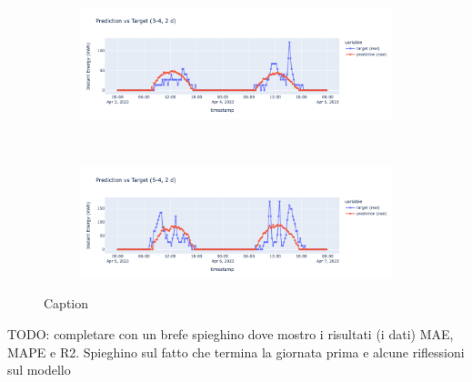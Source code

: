 \begin{figure}[H]
	\centering
	\begin{subfigure}{\textwidth}
		\centering
		\includegraphics[width=\textwidth]{chapters/3_models/imgs/ufnc/eval/ufcpred3-4.png}
		\caption{}
	\end{subfigure}\\
	\begin{subfigure}{\textwidth}
		\centering
		\includegraphics[width=\textwidth]{chapters/3_models/imgs/ufnc/eval/ufcpred5-4.png}
		\caption{}
	\end{subfigure}
	\caption{Caption}
	\label{fig:ufcnevalbrutti}
\end{figure}

TODO: completare con un brefe spieghino dove mostro i risultati
(i dati) MAE, MAPE e R2. Spieghino sul fatto che termina la giornata
prima e alcune riflessioni sul modello